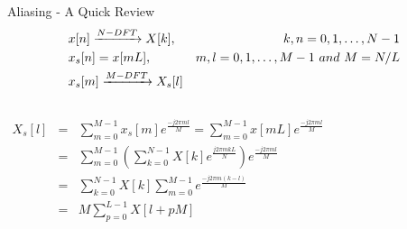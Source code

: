 \documentclass[10pt,xcolor=table]{beamer}
\begin{document}
	\begin{frame}{Aliasing - A Quick Review}
		\begin{eqnarray}\nonumber
		 &x[n] \xrightarrow{N-DFT} X[k] , \ \ &k,n = 0,1, \ldots,N-1 \\ \nonumber \vspace{15pt}
		 &x_{s}[n]  = x[mL] , \ \ &m,l = 0,1, \ldots, M-1 \ and \ M = N/L\\ \nonumber \vspace{15pt}
		 &x_s[m] \xrightarrow{M-DFT} X_s[l] \nonumber 
		\end{eqnarray}
		
		\vspace{-5pt}
		\begin{columns}
			\hspace{5pt}
			\begin{eqnarray}\nonumber
			X_s[l]&= &\sum\limits_{m=0}^{M-1}x_s[m] e^{\frac{-j2\pi ml}{M}}
			= \sum\limits_{m=0}^{M-1}x[mL] e^{\frac{-j2\pi ml}{M}}\\ \nonumber
			&= &\sum\limits_{m=0}^{M-1} (\sum\limits_{k=0}^{N-1} X[k] e^{\frac{j2\pi mkL}{N}}) e^{\frac{-j2\pi ml}{M}}\\ \nonumber
			&= &\sum\limits_{k=0}^{N-1} X[k] \sum\limits_{m=0}^{M-1}  e^{\frac{-j2\pi m(k-l)}{M}} \nonumber\\
			&=& M\sum\limits_{p=0}^{L-1}X[l+pM] \nonumber
			\end{eqnarray}
			
			
		\end{columns}
	\end{frame}
\end{document}
